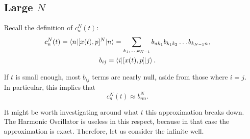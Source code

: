 \documentclass{article}
\begin{document}
\subsection{Large $N$}

Recall the definition of $c_n^N(t)$:
\begin{gather*}
c_n^N(t) = \braket{n|[x(t), p]^N|n} = \sum_{k_1, \dots, k_{N-1}} b_{nk_1} b_{k_1 k_2} \dots b_{k_{N-1} n},\\
b_{ij} = \braket{i|[x(t), p]|j}.
\end{gather*}

If $t$ is small enough, most $b_{ij}$ terms are nearly null, aside from those where $i = j$. In particular, this implies that
\begin{equation}\label{capproximatepower}
c_n^N(t) \approx b_{nn}^N.
\end{equation}

It might be worth investigating around what $t$ this approximation breaks down. The Harmonic Oscillator is useless in this respect, because in that case the approximation is exact. Therefore, let us consider the infinite well.

\nocite{Hashimoto_2017}
\nocite{romatschke2021quantum}



\end{document}
